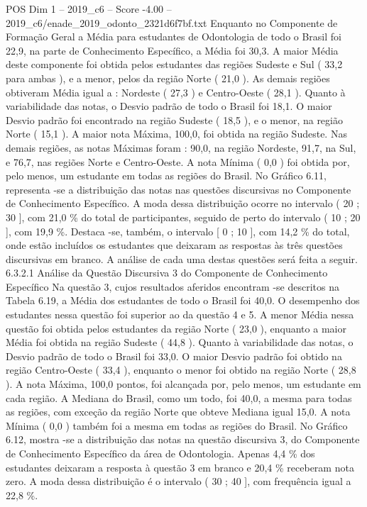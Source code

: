 \begin{textsample}{POS Dim 1 – 2019\_c6 – Score -4.00 – 2019\_c6/enade\_2019\_odonto\_2321d6f7bf.txt}
Enquanto no Componente de Formação Geral a Média para estudantes de Odontologia de todo o Brasil foi 22,9, na parte de Conhecimento Específico, a Média foi 30,3.
A maior Média deste componente foi obtida pelos estudantes das regiões Sudeste e Sul ( 33,2 para ambas ), e a menor, pelos da região Norte ( 21,0 ).
As demais regiões obtiveram Média igual a : Nordeste ( 27,3 ) e Centro-Oeste ( 28,1 ).
Quanto à variabilidade das notas, o Desvio padrão de todo o Brasil foi 18,1.
O maior Desvio padrão foi encontrado na região Sudeste ( 18,5 ), e o menor, na região Norte ( 15,1 ).
A maior nota Máxima, 100,0, foi obtida na região Sudeste.
Nas demais regiões, as notas Máximas foram : 90,0, na região Nordeste, 91,7, na Sul, e 76,7, nas regiões Norte e Centro-Oeste.
A nota Mínima ( 0,0 ) foi obtida por, pelo menos, um estudante em todas as regiões do Brasil.
No Gráfico 6.11, representa -se a distribuição das notas nas questões discursivas no Componente de Conhecimento Específico.
A moda dessa distribuição ocorre no intervalo ( 20 ; 30 ], com 21,0 \% do total de participantes, seguido de perto do intervalo ( 10 ; 20 ], com 19,9 \%.
Destaca -se, também, o intervalo [ 0 ; 10 ], com 14,2 \% do total, onde estão incluídos os estudantes que deixaram as respostas às três questões discursivas em branco.
A análise de cada uma destas questões será feita a seguir. 6.3.2.1 Análise da Questão Discursiva 3 do Componente de Conhecimento Específico Na questão 3, cujos resultados aferidos encontram -se descritos na Tabela 6.19, a Média dos estudantes de todo o Brasil foi 40,0.
O desempenho dos estudantes nessa questão foi superior ao da questão 4 e 5.
A menor Média nessa questão foi obtida pelos estudantes da região Norte ( 23,0 ), enquanto a maior Média foi obtida na região Sudeste ( 44,8 ).
Quanto à variabilidade das notas, o Desvio padrão de todo o Brasil foi 33,0.
O maior Desvio padrão foi obtido na região Centro-Oeste ( 33,4 ), enquanto o menor foi obtido na região Norte ( 28,8 ).
A nota Máxima, 100,0 pontos, foi alcançada por, pelo menos, um estudante em cada região.
A Mediana do Brasil, como um todo, foi 40,0, a mesma para todas as regiões, com exceção da região Norte que obteve Mediana igual 15,0.
A nota Mínima ( 0,0 ) também foi a mesma em todas as regiões do Brasil.
No Gráfico 6.12, mostra -se a distribuição das notas na questão discursiva 3, do Componente de Conhecimento Específico da área de Odontologia.
Apenas 4,4 \% dos estudantes deixaram a resposta à questão 3 em branco e 20,4 \% receberam nota zero.
A moda dessa distribuição é o intervalo ( 30 ; 40 ], com frequência igual a 22,8 \%.

\end{textsample}
